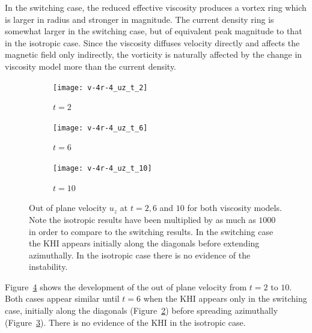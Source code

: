 In the switching case, the reduced effective viscosity produces a vortex ring which is larger in radius and stronger in magnitude. The current density ring is somewhat larger in the switching case, but of equivalent peak magnitude to that in the isotropic case. Since the viscosity diffuses velocity directly and affects the magnetic field only indirectly, the vorticity is naturally affected by the change in viscosity model more than the current density.

\begin{figure}[t]
  \centering
    \begin{subfigure}{0.32\textwidth}
      \texttt{[image: v-4r-4\_uz\_t\_2]}
      \caption{$t=2$}
      \label{fig:v-4r-4_uz_t_2}
    \end{subfigure}
    \begin{subfigure}{0.32\textwidth}
      \texttt{[image: v-4r-4\_uz\_t\_6]}
      \caption{$t=6$}
      \label{fig:v-4r-4_uz_t_6}
    \end{subfigure}
    \begin{subfigure}{0.32\textwidth}
      \texttt{[image: v-4r-4\_uz\_t\_10]}
      \caption{$t=10$}
      \label{fig:v-4r-4_uz_t_10}
    \end{subfigure}
\caption{Out of plane velocity $u_z$ at $t=2, 6$ and $10$ for both viscosity models. Note the isotropic results have been multiplied by as much as $1000$ in order to compare to the switching results. In the switching case the KHI appears initially along the diagonals before extending azimuthally. In the isotropic case there is no evidence of the instability.}
\label{fig:out_of_plane_velocity}%
\end{figure}

Figure~\ref{fig:out_of_plane_velocity} shows the development of the out of plane velocity from $t=2$ to $10$. Both cases appear similar until $t=6$ when the KHI appears only in the switching case, initially along the diagonals (Figure~\ref{fig:v-4r-4_uz_t_6}) before spreading azimuthally (Figure~\ref{fig:v-4r-4_uz_t_10}). There is no evidence of the KHI in the isotropic case.

